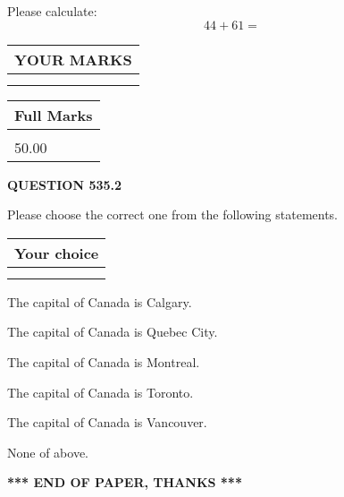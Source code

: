 \documentclass[12pt]{article}
\begin{document}
  
 
Please calculate:
\begin{equation}
44 +  %
61 = \nonumber
\end{equation}
 

 

 
  
\vspace{0.2in}
  
\noindent\begin{tabular}{|l|}
\hline
 YOUR MARKS  \\
\hline
 \\ 
 \\ 
\hline
\end{tabular}
\hspace{0.05in} \begin{tabular}{|l|}
\hline
 Full Marks  \\
\hline
 \\ 
50.00 \\
\hline
\end{tabular}
{\textbf{\Large{QUESTION
535.2 
}}}
  
  
Please choose the correct one from the following statements.
  
  
\noindent\hspace{3.0in} \begin{tabular}{|l|}
\hline
Your choice \\
\hline
 \\ 
 \\ 
\hline
\end{tabular}
  
  
 
 
The capital of Canada is Calgary.
 
 
The capital of Canada is Quebec City.
 
 
The capital of Canada is Montreal.
 
 
The capital of Canada is Toronto.
 
 
The capital of Canada is Vancouver.
 
 
 None of above.
 
 
   
   
 \vspace{0.2in}
 
   
   
   
   
\vspace{1.0in} 
{\textbf{\large{ *** END OF PAPER, THANKS *** }}} 
   
\end{document}
